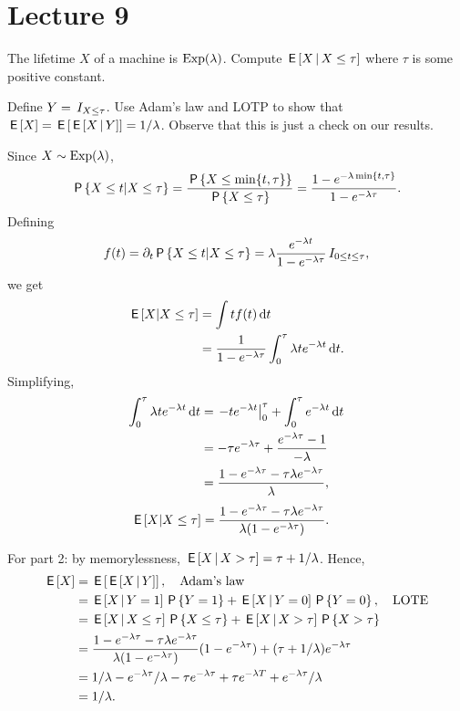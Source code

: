 \section{Lecture 9}
\label{sec:lecture-9}




\begin{exercise}
The lifetime $X$ of a machine is $\Exp{\lambda}$.
Compute $\E{X \given X\leq \tau}$ where $\tau$ is some positive constant.

Define $Y=\1{X\leq \tau}$.  Use  Adam's law and LOTP to show that $\E{X} = \E{\E{X\given Y}} = 1/\lambda$. Observe that this is just a check on our results.
\begin{solution}
Since $X\sim \Exp{\lambda}$,
\begin{equation*}
\P{X\leq t | X\leq \tau} = \frac{\P{X\leq \min\{t, \tau\}}}{\P{X\leq \tau}} = \frac{1-e^{-\lambda\min\{t, \tau\}}}{1-e^{-\lambda \tau}}.
\end{equation*}
 Defining
\begin{equation*}
  f(t) = \partial_{t} \P{X\leq t | X\leq \tau} = \lambda \frac{e^{-\lambda t}}{1-e^{-\lambda \tau}} \1{0\leq t \leq \tau},
\end{equation*}
we get
\begin{align}
  \label{eq:25}
\E{X|X\leq \tau}
&= \int t f(t) \d t \\
&= \frac{1}{1-e^{-\lambda \tau}}\int_{0}^{\tau} \lambda t e^{-\lambda t} \d t.
\end{align}
Simplifying,
\begin{align}
\label{eq:26}
\int_0^{\tau} \lambda t e^{-\lambda t} \d t
&= \left.- t e^{-\lambda t}\right|_{0}^{\tau} + \int_0^{\tau} e^{-\lambda t} \d t \\
&= -\tau e^{-\lambda \tau} + \frac{e^{-\lambda \tau} -1}{-\lambda} \\
&= \frac{ 1- e^{-\lambda \tau}- \tau \lambda  e^{-\lambda \tau}}{\lambda},
\end{align}
\begin{align}
  \label{eq:25}
\E{X|X\leq \tau}
&= \frac{ 1- e^{-\lambda \tau}- \tau \lambda  e^{-\lambda \tau}}{\lambda(1-e^{-\lambda \tau})}.
\end{align}

For part 2: by memorylessness, $\E{X\given X>\tau} = \tau + 1/\lambda$. Hence,
\begin{align}
  \label{eq:4}
\E X
&= \E{\E{X\given Y}}, \quad \text{Adam's law} \\
&= \E{X\given Y=1}\P{Y=1} + \E{X\given Y=0}\P{Y=0}, \quad \text{LOTE}\\
&= \E{X\given X\leq \tau}\P{X\leq \tau} + \E{X\given X>\tau} \P{X>\tau} \\
&= \frac{ 1- e^{-\lambda \tau}- \tau \lambda  e^{-\lambda \tau}}{\lambda(1-e^{-\lambda \tau})} (1-e^{-\lambda \tau}) + (\tau+ 1/\lambda) e^{-\lambda \tau} \\
&= 1/\lambda - e^{-\lambda \tau}/\lambda - \tau e^{-\lambda \tau} + \tau e^{-\lambda T} + e^{-\lambda \tau}/\lambda \\
&=1/\lambda.
\end{align}


\end{solution}
\end{exercise}

